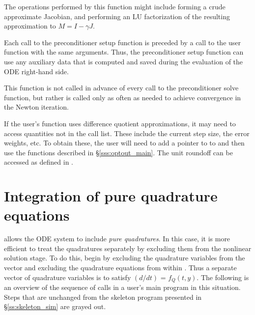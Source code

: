 {
  The operations performed by this function might include forming a crude 
  approximate Jacobian, and performing an LU factorization of the resulting
  approximation to $M=I - \gamma J$.

  Each call to the preconditioner setup function is preceded by a call to     
  the  user function with the same  arguments.  
  Thus, the preconditioner setup function can use any auxiliary data that is 
  computed and saved during the evaluation of the ODE right-hand side.
  
  This function is not called in advance of every call to the preconditioner
  solve function, but rather is called only as often as needed to achieve
  convergence in the Newton iteration. 

  If the user's  function uses difference quotient
  approximations, it may need to access quantities not in the call
  list. These include the current step size, the error weights, etc.
  To obtain these, the user will need to add a pointer to  
  to  and then use the  functions described in
  \S\ref{sss:optout_main}. The unit roundoff can be accessed as
   defined in .
}

\section{Integration of pure quadrature equations}
{\cvodes} allows the ODE system to include {\em pure quadratures}.  In
this case, it is more efficient to treat the quadratures separately by
excluding them from the nonlinear solution stage.  To do this, begin
by excluding the quadrature variables from the vector  and
excluding the quadrature equations from within .  Thus a
separate vector  of quadrature variables is to satisfy
$(d/dt)$ = $f_Q(t,y)$.  The following is an overview of the
sequence of calls in a user's main program in this situation. Steps
that are unchanged from the skeleton program presented in
\S\ref{ss:skeleton_sim} are grayed out.


